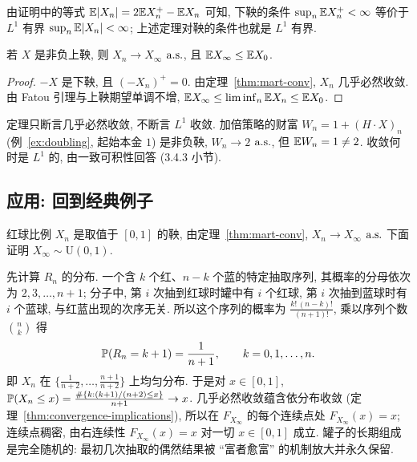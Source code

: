 由证明中的等式 $\E\abs{X_n}=2\E X_n^+-\E X_n$ 可知, 下鞅的条件 $\sup_n\E X_n^+<\infty$ 等价于 $L^1$ 有界 $\sup_n\E\abs{X_n}<\infty$; 上述定理对鞅的条件也就是 $L^1$ 有界.

\begin{corollary}[非负上鞅收敛定理]\label{cor:nonneg-supermart}
若 $X$ 是非负上鞅, 则 $X_n\to X_\infty$ $\as$, 且 $\E X_\infty\le\E X_0$.
\end{corollary}

\begin{proof}
$-X$ 是下鞅, 且 $(-X_n)^+=0$. 由定理~\ref{thm:mart-conv}, $X_n$ 几乎必然收敛. 由 Fatou 引理与上鞅期望单调不增, $\E X_\infty\le\liminf_n\E X_n\le\E X_0$.
\end{proof}

\begin{remark}
定理只断言几乎必然收敛, 不断言 $L^1$ 收敛. 加倍策略的财富 $W_n=1+(H\cdot X)_n$ (例~\ref{ex:doubling}, 起始本金 $1$) 是非负鞅, $W_n\to2$ $\as$, 但 $\E W_n=1\ne2$. 收敛何时是 $L^1$ 的, 由一致可积性回答 (3.4.3 小节).
\end{remark}

\subsection{应用: 回到经典例子}

\begin{example}\label{ex:polya-limit}
红球比例 $X_n$ 是取值于 $[0,1]$ 的鞅, 由定理~\ref{thm:mart-conv}, $X_n\to X_\infty$ $\as$ 下面证明 $X_\infty\sim\mathrm{U}(0,1)$.

先计算 $R_n$ 的分布. 一个含 $k$ 个红、$n-k$ 个蓝的特定抽取序列, 其概率的分母依次为 $2,3,\dots,n+1$; 分子中, 第 $i$ 次抽到红球时罐中有 $i$ 个红球, 第 $i$ 次抽到蓝球时有 $i$ 个蓝球, 与红蓝出现的次序无关. 所以这个序列的概率为 $\frac{k!\,(n-k)!}{(n+1)!}$, 乘以序列个数 $\binom{n}{k}$ 得
\[
\P(R_n=k+1)=\frac{1}{n+1},\qquad k=0,1,\dots,n.
\]
即 $X_n$ 在 $\big\{\frac{1}{n+2},\dots,\frac{n+1}{n+2}\big\}$ 上均匀分布. 于是对 $x\in[0,1]$, $\P(X_n\le x)=\frac{\#\{k: (k+1)/(n+2)\le x\}}{n+1}\to x$. 几乎必然收敛蕴含依分布收敛 (定理~\ref{thm:convergence-implications}), 所以在 $F_{X_\infty}$ 的每个连续点处 $F_{X_\infty}(x)=x$; 连续点稠密, 由右连续性 $F_{X_\infty}(x)=x$ 对一切 $x\in[0,1]$ 成立. 罐子的长期组成是完全随机的: 最初几次抽取的偶然结果被 ``富者愈富'' 的机制放大并永久保留.
\end{example}

